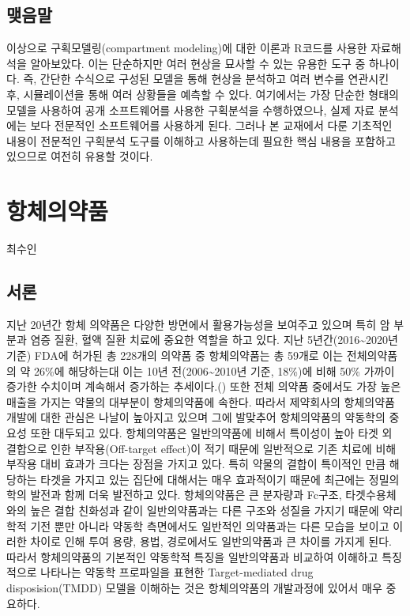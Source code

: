 \documentclass[
  11pt,
  krantz2, a4paper, twoside]{krantz}
\theoremstyle{definition}
\theoremstyle{definition}
\theoremstyle{definition}
\theoremstyle{definition}
\theoremstyle{remark}
\begin{document}
\section{맺음말}\label{uxb9fauxc74cuxb9d0-4}

이상으로 구획모델링(compartment modeling)에 대한 이론과 R코드를 사용한 자료해석을 알아보았다. 
이는 단순하지만 여러 현상을 묘사할 수 있는 유용한 도구 중 하나이다.
즉, 간단한 수식으로 구성된 모델을 통해 현상을 분석하고 여러 변수를 연관시킨 후, 시뮬레이션을 통해 여러 상황들을 예측할 수 있다. 
여기에서는 가장 단순한 형태의 모델을 사용하여 공개 소프트웨어를 사용한 구획분석을 수행하였으나, 실제 자료 분석에는 보다 전문적인 소프트웨어를 사용하게 된다.
그러나 본 교재에서 다룬 기초적인 내용이 전문적인 구획분석 도구를 이해하고 사용하는데 필요한 핵심 내용을 포함하고 있으므로 여전히 유용할 것이다.

\chapter{항체의약품}\label{antibody_drug}

\Large\hfill

최수인

\normalsize

\section{서론}\label{uxc11cuxb860-4}

지난 20년간 항체 의약품은 다양한 방면에서 활용가능성을 보여주고 있으며 특히 암 부분과 염증 질환, 혈액 질환 치료에 중요한 역할을 하고 있다. 
지난 5년간(2016\textasciitilde2020년 기준) FDA에 허가된 총 228개의 의약품 중 항체의약품는 총 59개로 이는 전체의약품의 약 26\%에 해당하는대 이는 10년 전(2006\textasciitilde2010년 기준, 18\%)에 비해 50\% 가까이 증가한 수치이며 계속해서 증가하는 추세이다.() 
또한 전체 의약품 중에서도 가장 높은 매출을 가지는 약물의 대부분이 항체의약품에 속한다. 따라서 제약회사의 항체의약품 개발에 대한 관심은 나날이 높아지고 있으며 그에 발맞추어 항체의약품의 약동학의 중요성 또한 대두되고 있다. 
항체의약품은 일반의약품에 비해서 특이성이 높아 타겟 외 결합으로 인한 부작용(Off-target effect)이 적기 때문에 일반적으로 기존 치료에 비해 부작용 대비 효과가 크다는 장점을 가지고 있다. 
특히 약물의 결합이 특이적인 만큼 해당하는 타겟을 가지고 있는 집단에 대해서는 매우 효과적이기 때문에 최근에는 정밀의학의 발전과 함께 더욱 발전하고 있다.
항체의약품은 큰 분자량과 Fc구조, 타겟수용체와의 높은 결합 친화성과 같이 일반의약품과는 다른 구조와 성질을 가지기 때문에 약리학적 기전 뿐만 아니라 약동학 측면에서도 일반적인 의약품과는 다른 모습을 보이고 이러한 차이로 인해 투여 용량, 용법, 경로에서도 일반의약품과 큰 차이를 가지게 된다. 
따라서 항체의약품의 기본적인 약동학적 특징을 일반의약품과 비교하여 이해하고 특징적으로 나타나는 약동학 프로파일을 표현한 Target-mediated drug disposision(TMDD) 모델을 이해하는 것은 항체의약품의 개발과정에 있어서 매우 중요하다. 
\end{document}
